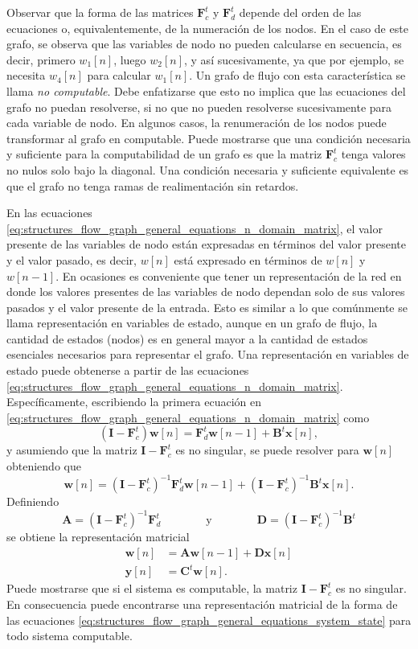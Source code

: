 \documentclass[a4paper]{report}
\newcommand{\x}{\mathbf{x}}
\newcommand{\y}{\mathbf{y}}
\newcommand{\w}{\mathbf{w}}
\newcommand{\I}{\mathbf{I}} %
\newcommand{\C}{\mathbf{C}} %
\newcommand{\A}{\mathbf{A}}
\newcommand{\B}{\mathbf{B}}
\newcommand{\D}{\mathbf{D}}
\newcommand{\F}{\mathbf{F}}
\begin{document}
Observar que la forma de las matrices \(\F_c^t\) y \(\F_d^t\) depende del orden de las ecuaciones o, equivalentemente, de la numeración de los nodos. En el caso de este grafo, se observa que las variables de nodo no pueden calcularse en secuencia, es decir, primero \(w_1[n]\), luego \(w_2[n]\), y así sucesivamente, ya que por ejemplo, se necesita \(w_4[n]\) para calcular \(w_1[n]\). Un grafo de flujo con esta característica se llama \emph{no computable}. Debe enfatizarse que esto no implica que las ecuaciones del grafo no puedan resolverse, si no que no pueden resolverse sucesivamente para cada variable de nodo. En algunos casos, la renumeración de los nodos puede transformar al grafo en computable. Puede mostrarse que una condición necesaria y suficiente para la computabilidad de un grafo es que la matriz \(\F_c^t\) tenga valores no nulos solo bajo la diagonal. Una condición necesaria y suficiente equivalente es que el grafo no tenga ramas de realimentación sin retardos.

En las ecuaciones \ref{eq:structures_flow_graph_general_equations_n_domain_matrix}, el valor presente de las variables de nodo están expresadas en términos del valor presente y el valor pasado, es decir, \(w[n]\) está expresado en términos de \(w[n]\) y \(w[n-1]\). En ocasiones es conveniente que tener un representación de la red en donde los valores presentes de las variables de nodo dependan solo de sus valores pasados y el valor presente de la entrada. Esto es similar a lo que comúnmente se llama representación en variables de estado, aunque en un grafo de flujo, la cantidad de estados (nodos) es en general mayor a la cantidad de estados esenciales necesarios para representar el grafo. Una representación en variables de estado puede obtenerse a partir de las ecuaciones \ref{eq:structures_flow_graph_general_equations_n_domain_matrix}. Específicamente, escribiendo la primera ecuación en \ref{eq:structures_flow_graph_general_equations_n_domain_matrix} como 
\[
 (\I-\F_c^t)\w[n]=\F_d^t\w[n-1]+\B^t\x[n],
\]
y asumiendo que la matriz \(\I-\F_c^t\) es no singular, se puede resolver para \(\w[n]\) obteniendo que 
\[
 \w[n]=(\I-\F_c^t)^{-1}\F_d^t\w[n-1]+(\I-\F_c^t)^{-1}\B^t\x[n].
\]
Definiendo
\[
 \A=(\I-\F_c^t)^{-1}\F_d^t
 \qquad\qquad\textrm{y}\qquad\qquad
 \D=(\I-\F_c^t)^{-1}\B^t
\]
se obtiene la representación matricial
\begin{equation}\label{eq:structures_flow_graph_general_equations_system_state}
 \begin{aligned}
  \w[n]&=\A\w[n-1]+\D\x[n]\\
  \y[n]&=\C^t\w[n].
 \end{aligned} 
\end{equation}
Puede mostrarse que si el sistema es computable, la matriz \(\I-\F_c^t\) es no singular. En consecuencia puede encontrarse una representación matricial de la forma de las ecuaciones \ref{eq:structures_flow_graph_general_equations_system_state} para todo sistema computable.
\end{document}
